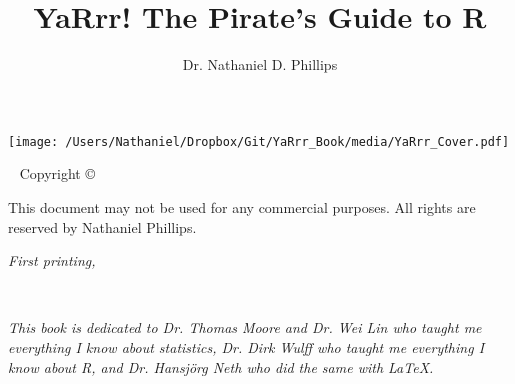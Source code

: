 \documentclass{tufte-book}\usepackage[]{graphicx}\usepackage[]{color}
\title{YaRrr! The Pirate's Guide to R}
\author{Dr. Nathaniel D. Phillips}
\begin{document}
\begin{center}
\texttt{[image: /Users/Nathaniel/Dropbox/Git/YaRrr\_Book/media/YaRrr\_Cover.pdf]}
\end{center}



\frontmatter

\maketitle


\newpage
\begin{fullwidth}
~\vfill
\thispagestyle{empty}
\setlength{\parindent}{0pt}
\setlength{\parskip}{\baselineskip}
Copyright \copyright\ \the\year\ \thanklessauthor

\par{}

\par{}

\par This document may not be used for any commercial purposes. All rights are reserved by Nathaniel Phillips.

\par\textit{First printing, \monthyear}
\end{fullwidth}


\tableofcontents %






\cleardoublepage
~\vfill
\begin{doublespace}
\noindent\fontsize{18}{22}\selectfont\itshape
\nohyphenation
This book is dedicated to Dr. Thomas Moore and Dr. Wei Lin who taught me everything I know about statistics, Dr. Dirk Wulff who taught me everything I know about R, and Dr. Hans\-j\"{o}rg Neth who did the same with LaTeX.
\end{doublespace}
\vfill
\end{document}
